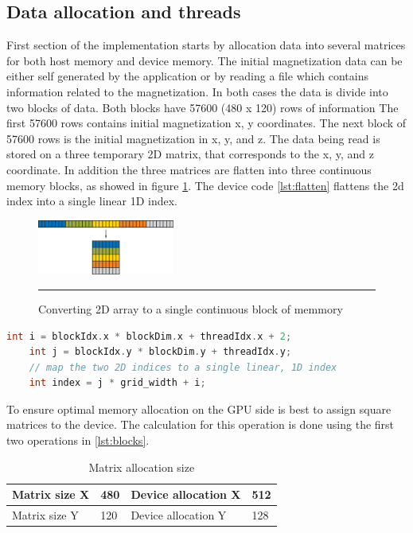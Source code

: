 \subsection{Data allocation and threads}

First section of the implementation starts by allocation data into several matrices for both host memory and device memory. The initial magnetization data can be either self generated by the application or by reading a file which contains information related to the magnetization. In both cases the data is divide into two blocks of data. Both blocks have 57600 (480 x 120) rows of information The first 57600 rows contains initial magnetization x, y coordinates. The next block of 57600 rows is the initial magnetization in x, y, and z. The data being read is stored on a three temporary 2D matrix, that corresponds to the x, y, and z coordinate. In addition the three matrices are flatten into three continuous memory blocks, as showed in figure \ref{fig:flaten}. The device code \ref{lst:flatten} flattens the 2d index into a single linear 1D index.

\begin{figure}[htbp]
	\centering
		\includegraphics[width=0.4\textwidth]{Figures/flaten.png}
		\rule{35em}{0.2pt}
	\caption[2D Flatten array]{Converting 2D array to a single continuous block of memmory}
	\label{fig:flaten}
\end{figure}

\begin{lstlisting}[language=C++, label={lst:flatten}, caption={Kernel Flatten}]	
    int i = blockIdx.x * blockDim.x + threadIdx.x + 2;
    int j = blockIdx.y * blockDim.y + threadIdx.y;
    // map the two 2D indices to a single linear, 1D index
    int index = j * grid_width + i;
\end{lstlisting}

To ensure optimal memory allocation on the GPU side is best to assign square matrices to the device. The calculation for this operation is done using the first two operations in \ref{lst:blocks}.

\begin{table}[h]
\centering
\begin{tabular}{| l | l | l | l | }
\hline
Matrix size X & 480 & Device allocation X & 512\\
\hline
Matrix size Y & 120 & Device allocation Y & 128 \\
\hline
\end{tabular}
\caption{Matrix allocation size}
\label{tab:cuda}
\end{table}

